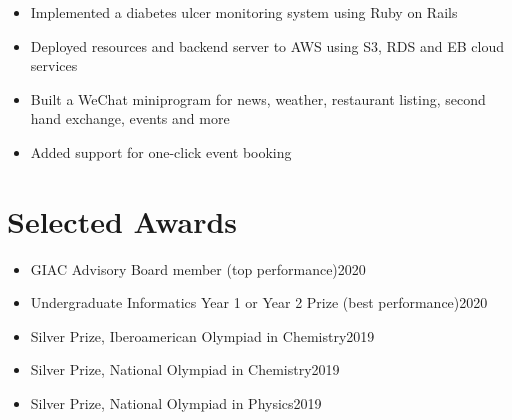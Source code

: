\documentclass{resume}
\begin{document}
\begin{itemize}
  \item Implemented a diabetes ulcer monitoring system using Ruby on Rails
  \item Deployed resources and backend server to AWS using S3, RDS and EB cloud services
\end{itemize}

\begin{itemize}
    \item Built a WeChat miniprogram for news, weather, restaurant listing, second hand exchange, events and more
    \item Added support for one-click event booking
\end{itemize}


\section{Selected Awards}
\begin{itemize}
    \item GIAC Advisory Board member (top performance)\hfill 2020
    \item Undergraduate Informatics Year 1 or Year 2 Prize (best performance)\hfill 2020
    \item Silver Prize, Iberoamerican Olympiad in Chemistry\hfill 2019
    \item Silver Prize, National Olympiad in Chemistry\hfill 2019
    \item Silver Prize, National Olympiad in Physics\hfill 2019
\end{itemize}


\end{document}
